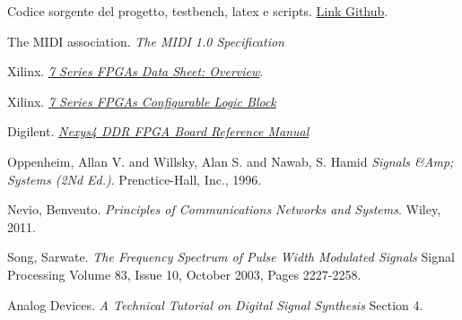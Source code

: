 \begin{thebibliography}{9}
Codice sorgente del progetto, testbench, latex e scripts.
\href{http://github.com/doppioandante/tesi}{Link Github}.

The MIDI association.
\textit{The MIDI 1.0 Specification}

Xilinx.
\href{https://www.xilinx.com/support/documentation/data_sheets/ds180_7Series_Overview.pdf}{\textit{7 Series FPGAs Data Sheet: Overview}}.

Xilinx.
\href{https://www.xilinx.com/support/documentation/user_guides/ug474_7Series_CLB.pdf}{\textit{7 Series FPGAs Configurable Logic Block}}

Digilent.
\href{https://www.xilinx.com/support/documentation/university/XUP%20Boards/XUPNexys4DDR/documentation/Nexys4-DDR_rm.pdf}{\textit{Nexys4 DDR FPGA Board Reference Manual}}

Oppenheim, Allan V. and Willsky, Alan S. and Nawab, S. Hamid
\textit{Signals \&Amp; Systems (2Nd Ed.)}.
Prenctice-Hall, Inc., 1996.

Nevio, Benveuto.
\textit{Principles of Communications Networks and Systems}.
Wiley, 2011.

Song, Sarwate.
\textit{The Frequency Spectrum of Pulse Width Modulated Signals}
Signal Processing Volume 83, Issue 10, October 2003, Pages 2227-2258.

Analog Devices.
\textit{A Technical Tutorial on Digital Signal Synthesis}
Section 4.
\end{thebibliography}
